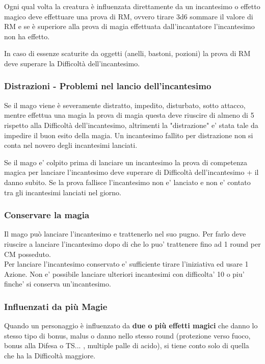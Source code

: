 Ogni qual volta la creatura è influenzata direttamente da un incantesimo o effetto magico deve effettuare una prova di RM, ovvero tirare 3d6 sommare il valore di RM e se è superiore alla prova di magia effettuata dall'incantatore l'incantesimo non ha effetto.

In caso di essenze scaturite da oggetti (anelli, bastoni, pozioni) la prova di RM deve superare la Difficoltà dell'incantesimo.

\subsubsection{Distrazioni - Problemi nel lancio dell'incantesimo}

Se il mago viene è severamente distratto, impedito, disturbato, sotto attacco, mentre effettua una magia la prova di magia questa deve riuscire di almeno di 5 rispetto alla Difficoltà dell'incantesimo, altrimenti la "distrazione" e' stata tale da impedire il buon esito della magia.
Un incantesimo fallito per distrazione non si conta nel novero degli incantesimi lanciati.

Se il mago e' colpito prima di lanciare un incantesimo la prova di competenza magica per lanciare l'incantesimo deve superare di Difficoltà dell'incantesimo + il danno subito. Se la prova fallisce l'incantesimo non e' lanciato e non e' contato tra gli incantesimi lanciati nel giorno.

\subsubsection{Conservare la magia}

Il mago può lanciare l'incantesimo e trattenerlo nel suo pugno. Per farlo deve riuscire a lanciare l'incantesimo dopo di che lo puo' trattenere fino ad 1 round per CM posseduto.\\
Per lanciare l'incantesimo conservato e' sufficiente tirare l'iniziativa ed usare 1 Azione. Non e' possibile lanciare ulteriori incantesimi con difficolta' 10 o piu' finche' si conserva un'incantesimo.

\subsubsection{Influenzati da più Magie}

Quando un personaggio è influenzato da \textbf{due o più effetti magici} che danno lo stesso tipo di bonus, malus o danno nello stesso round (protezione verso fuoco, bonus alla Difesa o TS... , multiple palle di acido), si tiene conto solo di quella che ha la Difficoltà maggiore.

